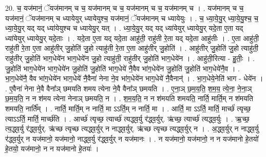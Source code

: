 \documentclass[17pt]{extarticle}
\begin{document}
20. च॒ यज॑मानं॒ ॅयज॑मानम् च च॒ यज॑मानम् च च॒ यज॑मानम् च च॒ यज॑मानम् च । . यज॑मानम् च च॒ यज॑मानं॒ ॅयज॑मानम् च ध्यायेयुर् ध्यायेयुश्च॒ यज॑मानं॒ ॅयज॑मानम् च ध्यायेयुः । . च॒ ध्या॒ये॒यु॒र् ध्या॒ये॒यु॒श्च॒ च॒ ध्या॒ये॒यु॒र् यद् यद् ध्या॑येयुश्च च ध्यायेयु॒र् यत् । . ध्या॒ये॒यु॒र् यद् यद् ध्या॑येयुर् ध्यायेयु॒र् यदे॒ता ए॒ता यद् ध्या॑येयुर् ध्यायेयु॒र् यदे॒ताः । . यदे॒ता ए॒ता यद् यदे॒ता आहु॑ती॒ राहु॑ती रे॒ता यद् यदे॒ता आहु॑तीः । . ए॒ता आहु॑ती॒ राहु॑ती रे॒ता ए॒ता आहु॑तीर् जु॒होति॑ जु॒हो त्याहु॑ती रे॒ता ए॒ता आहु॑तीर् जु॒होति॑ । . आहु॑तीर् जु॒होति॑ जु॒हो त्याहु॑ती॒ राहु॑तीर् जु॒होति॑ भाग॒धेये॑न भाग॒धेये॑न जु॒हो त्याहु॑ती॒ राहु॑तीर् जु॒होति॑ भाग॒धेये॑न । . आहु॑ती॒रित्या - हु॒तीः॒ । . जु॒होति॑ भाग॒धेये॑न भाग॒धेये॑न जु॒होति॑ जु॒होति॑ भाग॒धेये॑ नै॒वैव भा॑ग॒धेये॑न जु॒होति॑ जु॒होति॑ भाग॒धेये॑नै॒व । . भा॒ग॒धेये॑नै॒ वैव भा॑ग॒धेये॑न भाग॒धेये॑ नै॒वैना॑ नेना ने॒व भा॑ग॒धेये॑न भाग॒धेये॑
नै॒वैनान्॑ । . भा॒ग॒धेये॒नेति॑ भाग - धेये॑न । . ए॒वैना॑ नेना ने॒वै वैना᳚ञ् छमयति शमय त्येना ने॒वै वैना᳚ञ् छमयति । . ए॒ना॒ञ् छ॒म॒य॒ति॒ श॒म॒य॒ त्ये॒ना॒ ने॒ना॒ञ् छ॒म॒य॒ति॒ न न श॑मय त्येना नेनाञ् छमयति॒ न । . श॒म॒य॒ति॒ न न श॑मयति शमयति॒ नार्ति॒ मार्ति॒म् न श॑मयति शमयति॒ नार्ति᳚म् । . नार्ति॒ मार्ति॒म् न नार्ति॒ मा ऽऽर्ति॒म् न नार्ति॒ मा । . आर्ति॒ मा ऽऽर्ति॒ मार्ति॒ मार्च्छ॑ त्यृच्छ॒ त्याऽऽर्ति॒ मार्ति॒ मार्च्छ॑ति । . आर्च्छ॑ त्यृच्छ॒ त्यार्च्छ॑ त्यद्ध्व॒र्यु र॑द्ध्व॒र्युर्. ऋ॑च्छ॒ त्यार्च्छ॑ त्यद्ध्व॒र्युः । . ऋ॒च्छ॒ त्य॒द्ध्व॒र्यु र॑द्ध्व॒र्युर्. ऋ॑च्छ त्यृच्छ त्यद्ध्व॒र्युर् न नाद्ध्व॒र्युर्. ऋ॑च्छ त्यृच्छ त्यद्ध्व॒र्युर् न । . अ॒द्ध्व॒र्युर् न नाद्ध्व॒र्यु र॑द्ध्व॒र्युर् न यज॑मानो॒ यज॑मानो॒ नाद्ध्व॒र्यु र॑द्ध्व॒र्युर् न यज॑मानः । . न यज॑मानो॒ यज॑मानो॒ न न यज॑मानो हे॒तयो॑ हे॒तयो॒ यज॑मानो॒ न न यज॑मानो हे॒तयः॑ । \newline
\end{document}
